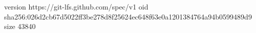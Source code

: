 version https://git-lfs.github.com/spec/v1
oid sha256:026d2cb67d5022ff3be278d8f25624ec648f63e0a1201384764a94b0599489d9
size 43840
